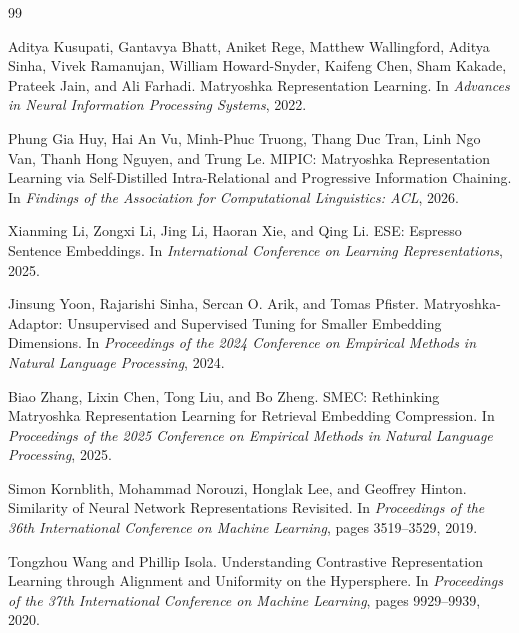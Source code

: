 \documentclass[11pt]{article}
\begin{document}

\begin{thebibliography}{99}

Aditya Kusupati, Gantavya Bhatt, Aniket Rege, Matthew Wallingford,
Aditya Sinha, Vivek Ramanujan, William Howard-Snyder, Kaifeng Chen,
Sham Kakade, Prateek Jain, and Ali Farhadi.
\newblock Matryoshka Representation Learning.
\newblock In \emph{Advances in Neural Information Processing Systems},
2022.

Phung Gia Huy, Hai An Vu, Minh-Phuc Truong, Thang Duc Tran,
Linh Ngo Van, Thanh Hong Nguyen, and Trung Le.
\newblock MIPIC: Matryoshka Representation Learning via Self-Distilled
Intra-Relational and Progressive Information Chaining.
\newblock In \emph{Findings of the Association for Computational
Linguistics: ACL}, 2026.

Xianming Li, Zongxi Li, Jing Li, Haoran Xie, and Qing Li.
\newblock ESE: Espresso Sentence Embeddings.
\newblock In \emph{International Conference on Learning Representations},
2025.

Jinsung Yoon, Rajarishi Sinha, Sercan O. Arik, and Tomas Pfister.
\newblock Matryoshka-Adaptor: Unsupervised and Supervised Tuning for
Smaller Embedding Dimensions.
\newblock In \emph{Proceedings of the 2024 Conference on Empirical
Methods in Natural Language Processing}, 2024.

Biao Zhang, Lixin Chen, Tong Liu, and Bo Zheng.
\newblock SMEC: Rethinking Matryoshka Representation Learning for
Retrieval Embedding Compression.
\newblock In \emph{Proceedings of the 2025 Conference on Empirical
Methods in Natural Language Processing}, 2025.

Simon Kornblith, Mohammad Norouzi, Honglak Lee, and Geoffrey Hinton.
\newblock Similarity of Neural Network Representations Revisited.
\newblock In \emph{Proceedings of the 36th International Conference on
Machine Learning}, pages 3519--3529, 2019.

Tongzhou Wang and Phillip Isola.
\newblock Understanding Contrastive Representation Learning through
Alignment and Uniformity on the Hypersphere.
\newblock In \emph{Proceedings of the 37th International Conference on
Machine Learning}, pages 9929--9939, 2020.


\end{thebibliography}
\end{document}
